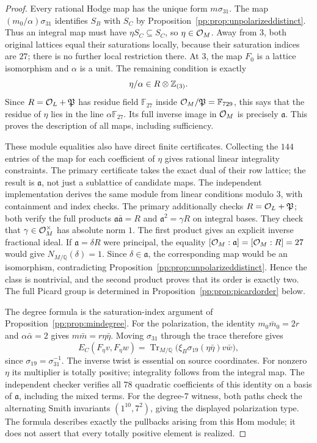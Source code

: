\begin{proof}
Every rational Hodge map has the unique form $m\sigma_{31}$.
The map $(m_0/\alpha)\sigma_{31}$ identifies $S_B$ with $S_C$
by Proposition~\ref{pp:prop:unpolarizeddistinct}.
Thus an integral map must have $\eta S_C\subseteq S_C$, so
$\eta\in\mathcal O_M$. Away from $3$, both original lattices equal their
saturations locally, because their saturation indices are $27$;
there is no further local restriction there.
At $3$, the map $F_0$ is a lattice isomorphism and $\alpha$ is a unit.
The remaining condition is exactly
\[
 \eta/\alpha\in R\otimes\mathbb Z_{(3)}.
\]
Since $R=\mathcal O_L+\mathfrak P$ has residue field $\mathbb F_{27}$
inside $\mathcal O_M/\mathfrak P=\mathbb F_{729}$, this says that the
residue of $\eta$ lies in the line $\alpha\mathbb F_{27}$.
Its full inverse image in $\mathcal O_M$ is precisely $\mathfrak a$.
This proves the description of all maps, including sufficiency.

These module equalities also have direct finite certificates. Collecting
the $144$ entries of the map for each coefficient of $\eta$ gives
rational linear integrality constraints. The primary certificate
 takes the exact dual
of their row lattice; the result is $\mathfrak a$, not just a
sublattice of candidate maps. The independent implementation
 derives the same module
from linear conditions modulo $3$, with containment and index checks.
The primary additionally checks $R=\mathcal O_L+\mathfrak P$; both verify
the full products
$\mathfrak a\bar{\mathfrak a}=R$ and
$\mathfrak a^2=\gamma R$ on integral bases.
They check that $\gamma\in\mathcal O_M^\times$ has absolute norm $1$.
The first product gives an explicit inverse fractional ideal.
If $\mathfrak a=\delta R$ were principal, the equality
$[\mathcal O_M:\mathfrak a]=[\mathcal O_M:R]=27$ would give
$N_{M/\mathbb Q}(\delta)=1$. Since $\delta\in\mathfrak a$,
the corresponding map would be an isomorphism, contradicting
Proposition~\ref{pp:prop:unpolarizeddistinct}. Hence the class is
nontrivial, and the second product proves that its order is exactly two.
The full Picard group is determined in Proposition~\ref{pp:prop:picardorder} below.

The degree formula is the saturation-index argument of
Proposition~\ref{pp:prop:mindegree}. For the polarization, the identity
$m_0\bar m_0=2r$ and $\alpha\bar\alpha=2$ gives
$m\bar m=r\eta\bar\eta$. Moving $\sigma_{31}$ through the trace
therefore gives
\[
 E_C(F_\eta v,F_\eta w)
 =\operatorname{Tr}_{M/\mathbb Q}
   \bigl(\xi_B\sigma_{19}(\eta\bar\eta)v\bar w\bigr),
\]
since $\sigma_{19}=\sigma_{31}^{-1}$. The inverse twist is essential
on source coordinates. For nonzero $\eta$ its multiplier is totally
positive; integrality follows from the integral map.
The independent checker verifies all $78$ quadratic coefficients
of this identity on a basis of $\mathfrak a$, including the mixed terms.
For the degree-$7$ witness, both paths check the alternating Smith
invariants $(1^{10},7^2)$, giving the displayed polarization type.
The formula describes exactly the pullbacks arising from this Hom
module; it does not assert that every totally positive element is realized.
\end{proof}

